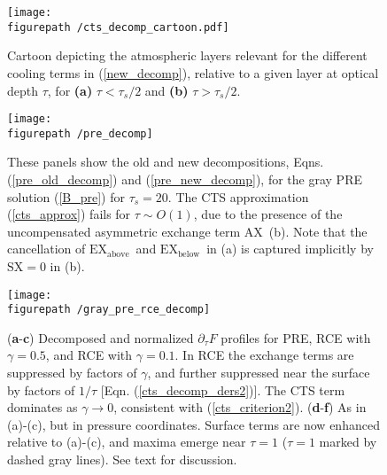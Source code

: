 \documentclass{ametsoc}
\newcommand{\eqnref}[1]{(\ref{#1})}
\newcommand{\pptau}{\ensuremath{\partial_\tau}}
\newcommand{\taus}{\ensuremath{\tau_s}}
\newcommand{\SX}{\ensuremath{\mathrm{SX}}}
\newcommand{\AX}{\ensuremath{\mathrm{AX}}}
\newcommand{\EXbelow}{\ensuremath{\mathrm{EX_{below}}}}
\newcommand{\EXabove}{\ensuremath{\mathrm{EX_{above}}}}
\newcommand{\figurepath}{../plots/}
\begin{document}
%
%
%
 
 



\begin{figure}[h!]
	\begin{center}
			\texttt{[image: \\figurepath /cts\_decomp\_cartoon.pdf]}
		\caption{Cartoon depicting the atmospheric layers relevant for the different cooling terms in \eqnref{new_decomp}, relative to a given layer at optical depth $\tau$, for \textbf{(a)} $\tau < \taus/2$  and \textbf{(b)} $\tau>\taus/2$.
		\label{decomp_cartoon}
		}
	\end{center}
\end{figure}

\begin{figure}[h]
	\begin{center}
			\texttt{[image: \\figurepath /pre\_decomp]}
		\caption{These panels show the old and new decompositions, Eqns. \eqnref{pre_old_decomp}  and  \eqnref{pre_new_decomp}, for the gray PRE solution \eqnref{B_pre} for $\taus=20$. The CTS approximation \eqnref{cts_approx} fails for $\tau\sim O(1)$, due to the presence of the uncompensated asymmetric exchange term \AX\ (b). Note that the cancellation of \EXabove\ and \EXbelow\ in (a) is captured implicitly by $\SX=0$ in (b).
		\label{pre_decomp}
		}
	\end{center}
\end{figure}

\begin{figure}[h]
	\begin{center}
			\texttt{[image: \\figurepath /gray\_pre\_rce\_decomp]}
		\caption{(\textbf{a}-\textbf{c}) Decomposed and normalized $\pptau F$ profiles for PRE, RCE with $\gamma=0.5$, and RCE with $\gamma=0.1$. In RCE the exchange terms are suppressed by factors of $\gamma$, and further suppressed near the surface by factors of $1/\tau$ [Eqn. \eqnref{cts_decomp_ders2}]. The CTS term dominates as $\gamma\rightarrow 0$, consistent with \eqnref{cts_criterion2}. 
		(\textbf{d}-\textbf{f}) As in (a)-(c), but in pressure coordinates. Surface terms are now enhanced relative to (a)-(c), and maxima emerge near  $\tau= 1$ ($\tau=1$ marked by dashed gray lines). See text for discussion.
		\label{gray_rce}
		}
	\end{center}
\end{figure}
\end{document}
